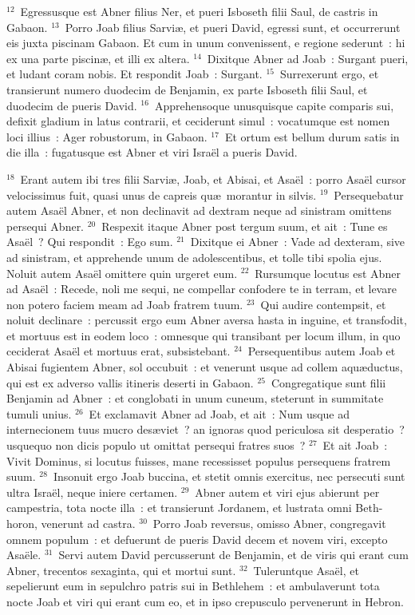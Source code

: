 ${}^{12}$~Egressusque est Abner filius Ner, et pueri Isboseth filii Saul, de castris in Gabaon.
${}^{13}$~Porro Joab filius Sarvi\ae , et pueri David, egressi sunt, et occurrerunt eis juxta piscinam Gabaon. Et cum in unum convenissent, e regione sederunt~: hi ex una parte piscin\ae , et illi ex altera.
${}^{14}$~Dixitque Abner ad Joab~: Surgant pueri, et ludant coram nobis. Et respondit Joab~: Surgant.
${}^{15}$~Surrexerunt ergo, et transierunt numero duodecim de Benjamin, ex parte Isboseth filii Saul, et duodecim de pueris David.
${}^{16}$~Apprehensoque unusquisque capite comparis sui, defixit gladium in latus contrarii, et ceciderunt simul~: vocatumque est nomen loci illius~: Ager robustorum, in Gabaon.
${}^{17}$~Et ortum est bellum durum satis in die illa~: fugatusque est Abner et viri Isra\"el a pueris David.


${}^{18}$~Erant autem ibi tres filii Sarvi\ae , Joab, et Abisai, et Asa\"el~: porro Asa\"el cursor velocissimus fuit, quasi unus de capreis qu\ae\ morantur in silvis.
${}^{19}$~Persequebatur autem Asa\"el Abner, et non declinavit ad dextram neque ad sinistram omittens persequi Abner.
${}^{20}$~Respexit itaque Abner post tergum suum, et ait~: Tune es Asa\"el~? Qui respondit~: Ego sum.
${}^{21}$~Dixitque ei Abner~: Vade ad dexteram, sive ad sinistram, et apprehende unum de adolescentibus, et tolle tibi spolia ejus. Noluit autem Asa\"el omittere quin urgeret eum.
${}^{22}$~Rursumque locutus est Abner ad Asa\"el~: Recede, noli me sequi, ne compellar confodere te in terram, et levare non potero faciem meam ad Joab fratrem tuum.
${}^{23}$~Qui audire contempsit, et noluit declinare~: percussit ergo eum Abner aversa hasta in inguine, et transfodit, et mortuus est in eodem loco~: omnesque qui transibant per locum illum, in quo ceciderat Asa\"el et mortuus erat, subsistebant.
${}^{24}$~Persequentibus autem Joab et Abisai fugientem Abner, sol occubuit~: et venerunt usque ad collem aqu\ae ductus, qui est ex adverso vallis itineris deserti in Gabaon.
${}^{25}$~Congregatique sunt filii Benjamin ad Abner~: et conglobati in unum cuneum, steterunt in summitate tumuli unius.
${}^{26}$~Et exclamavit Abner ad Joab, et ait~: Num usque ad internecionem tuus mucro des\ae viet~? an ignoras quod periculosa sit desperatio~? usquequo non dicis populo ut omittat persequi fratres suos~?
${}^{27}$~Et ait Joab~: Vivit Dominus, si locutus fuisses, mane recessisset populus persequens fratrem suum.
${}^{28}$~Insonuit ergo Joab buccina, et stetit omnis exercitus, nec persecuti sunt ultra Isra\"el, neque iniere certamen.
${}^{29}$~Abner autem et viri ejus abierunt per campestria, tota nocte illa~: et transierunt Jordanem, et lustrata omni Beth-horon, venerunt ad castra.
${}^{30}$~Porro Joab reversus, omisso Abner, congregavit omnem populum~: et defuerunt de pueris David decem et novem viri, excepto Asa\"ele.
${}^{31}$~Servi autem David percusserunt de Benjamin, et de viris qui erant cum Abner, trecentos sexaginta, qui et mortui sunt.
${}^{32}$~Tuleruntque Asa\"el, et sepelierunt eum in sepulchro patris sui in Bethlehem~: et ambulaverunt tota nocte Joab et viri qui erant cum eo, et in ipso crepusculo pervenerunt in Hebron.


